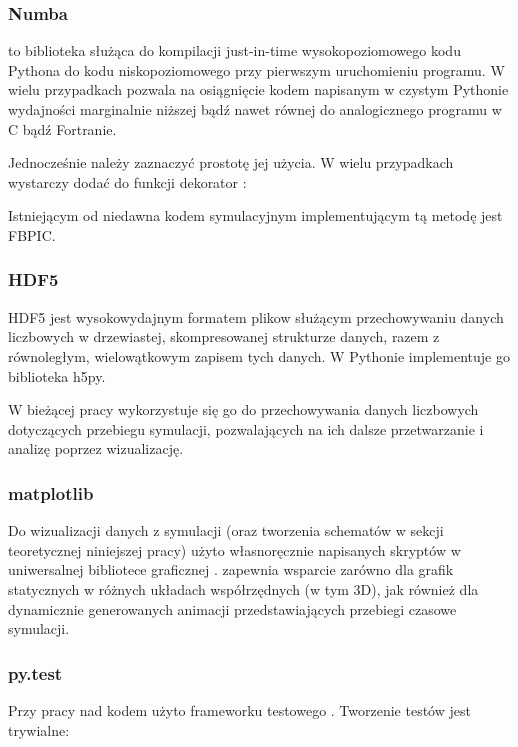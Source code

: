     \subsubsection{Numba}
     to biblioteka służąca do kompilacji just-in-time wysokopoziomowego
    kodu Pythona do kodu niskopoziomowego przy pierwszym uruchomieniu programu. W
    wielu przypadkach pozwala na osiągnięcie kodem napisanym w czystym Pythonie
    wydajności marginalnie niższej bądź nawet równej do analogicznego programu w C
    bądź Fortranie. \cite{numba}

    Jednocześnie należy zaznaczyć prostotę jej użycia. W wielu przypadkach wystarczy
    dodać do funkcji dekorator :




    Istniejącym od niedawna kodem symulacyjnym implementującym tą metodę jest FBPIC\cite{fbpic}.


    \subsubsection{HDF5}
    HDF5 jest wysokowydajnym formatem plikow służącym przechowywaniu danych
    liczbowych w drzewiastej, skompresowanej strukturze danych, razem z
    równoległym, wielowątkowym zapisem tych danych.  W Pythonie implementuje go
    biblioteka h5py\cite{h5py}.

    W bieżącej pracy wykorzystuje się go do przechowywania danych liczbowych
    dotyczących przebiegu symulacji, pozwalających na ich dalsze przetwarzanie
    i analizę poprzez wizualizację.

    \subsubsection{matplotlib}
    Do wizualizacji danych z symulacji (oraz tworzenia schematów w sekcji
    teoretycznej niniejszej pracy) użyto własnoręcznie napisanych skryptów w
    uniwersalnej bibliotece graficznej \cite{matplotlib}.
     zapewnia wsparcie zarówno dla grafik statycznych w różnych układach
    współrzędnych (w tym 3D), jak również dla dynamicznie generowanych animacji
    przedstawiających przebiegi czasowe symulacji.

    \subsubsection{py.test}
    Przy pracy nad kodem użyto frameworku testowego  \cite{pytest}.
    Tworzenie testów jest trywialne:

